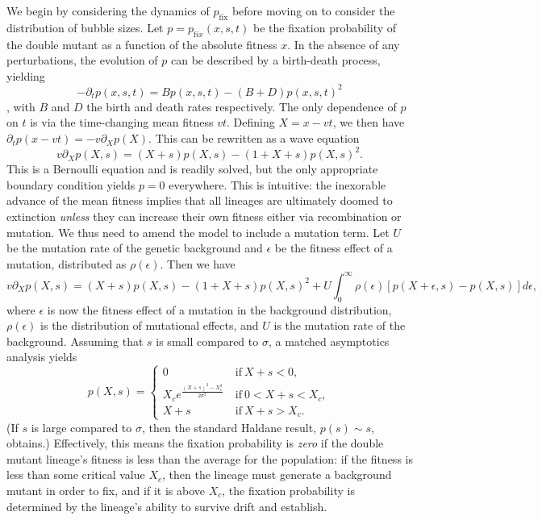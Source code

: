 \documentclass[rmp]{revtex4}
\begin{document}
We begin by considering the dynamics of $p_{\mathrm {fix}}$ before moving on to consider the distribution of bubble sizes.
Let $p = p_{\mathrm fix}(x,s,t)$ be the fixation probability of the double mutant as a function of the absolute fitness $x$.
In the absence of any perturbations, the evolution of $p$ can be described by a birth-death process, yielding
\begin{equation}
-\partial_t p(x,s,t) = Bp(x,s,t) - (B+D)p(x,s,t)^2
\end{equation}
\citep{barton_1995, good_2012}, with $B$ and $D$ the birth and death rates respectively.
The only dependence of $p$ on $t$ is via the time-changing mean fitness $vt$.
Defining $X = x - vt$, we then have $\partial_t p(x-vt) = -v\partial_X p(X)$.
This can be rewritten as a wave equation
\begin{equation}
v \partial_X p(X,s) = (X+s)p(X,s) - (1+X+s)p(X,s)^2.
\end{equation}
This is a Bernoulli equation and is readily solved, but the only appropriate boundary condition yields $p = 0$ everywhere.
This is intuitive: the inexorable advance of the mean fitness implies that all lineages are ultimately doomed to extinction \emph{unless} they can increase their own fitness either via recombination or mutation.
We thus need to amend the model to include a mutation term.
Let $U$ be the mutation rate of the genetic background and $\epsilon$ be the fitness effect of a mutation, distributed as $\rho(\epsilon)$.
Then we have
\begin{equation}
v \partial_X p(X,s) = (X+s)p(X,s) - (1+X+s)p(X,s)^2 + U\int_0^\infty \rho(\epsilon) \left[ p(X+\epsilon,s)-p(X,s)\right] d\epsilon,
\end{equation}
where $\epsilon$ is now the fitness effect of a mutation in the background distribution, $\rho(\epsilon)$ is the distribution of mutational effects, and $U$ is the mutation rate of the background.
Assuming that $s$ is small compared to $\sigma$, a matched asymptotics analysis yields
\begin{equation}
p(X,s) =
\begin{cases}
0 &\mathrm{~if~} X+s < 0, \\
X_c e^{\frac{(X+s)^2-X_c^2}{2\sigma^2}} &\mathrm{~if~} 0 < X+s < X_c, \\
X+s &\mathrm{~if~} X+s > X_c.
\end{cases}
\end{equation}
(If $s$ is large compared to $\sigma$, then the standard Haldane result, $p(s) \sim s$, obtains.)
Effectively, this means the fixation probability is \emph{zero} if the double mutant lineage's fitness is less than the average for the population: if the fitness is less than some critical value $X_c$, then the lineage must generate a background mutant in order to fix, and if it is above $X_c$, the fixation probability is determined by the lineage's ability to survive drift and establish.
\end{document}
